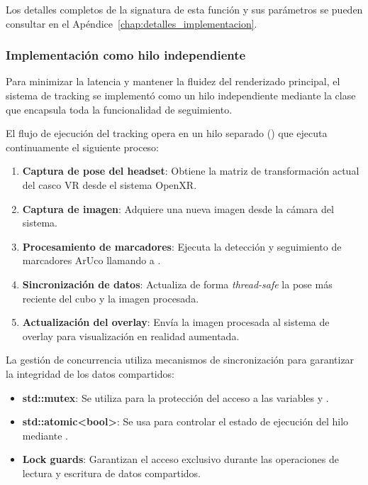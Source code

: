 Los detalles completos de la signatura de esta función y sus parámetros se pueden consultar en el Apéndice~\ref{chap:detalles_implementacion}.

\subsubsection{Implementación como hilo independiente}
Para minimizar la latencia y mantener la fluidez del renderizado principal, el sistema de tracking se implementó como un hilo independiente mediante la clase  que encapsula toda la funcionalidad de seguimiento.

El flujo de ejecución del tracking opera en un hilo separado () que ejecuta continuamente el siguiente proceso:

\begin{enumerate}
    \item \textbf{Captura de pose del headset}: Obtiene la matriz de transformación actual del casco VR desde el sistema OpenXR.
    \item \textbf{Captura de imagen}: Adquiere una nueva imagen desde la cámara del sistema.
    \item \textbf{Procesamiento de marcadores}: Ejecuta la detección y seguimiento de marcadores ArUco llamando a .
    \item \textbf{Sincronización de datos}: Actualiza de forma \emph{thread-safe} la pose más reciente del cubo y la imagen procesada.
    \item \textbf{Actualización del overlay}: Envía la imagen procesada al sistema de overlay para visualización en realidad aumentada.
\end{enumerate}

La gestión de concurrencia utiliza mecanismos de sincronización para garantizar la integridad de los datos compartidos:
\begin{itemize}
    \item \textbf{std::mutex}: Se utiliza para la protección del acceso a
      las variables  y .
    \item \textbf{std::atomic<bool>}: Se usa para controlar el estado de ejecución del hilo mediante .
    \item \textbf{Lock guards}: Garantizan el acceso exclusivo durante las operaciones de lectura y escritura de datos compartidos.
\end{itemize}

